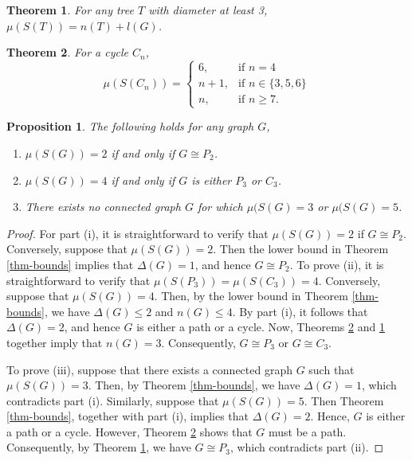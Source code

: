 \documentclass[10pt,a4paper]{amsart}
\newtheorem{theorem}{Theorem}
\newtheorem{proposition}{Proposition}
\begin{document}
\begin{theorem}\label{mv-tree}
    For any tree $T$ with diameter at least 3, $\mu(S(T)) = n(T)+l(G)$. 
\end{theorem}

\begin{theorem}\label{mv-cycle}
 For a cycle $C_n$, 
 $$ \mu(S(C_n))= \begin{cases}
        6, & \text{if } n=4\\
        n+1, & \text{if } n \in \{3,5,6\}\\
        n, & \text{if } n\geq 7.
    \end{cases}$$
\end{theorem}

\begin{proposition}
    The following holds for any graph $G$,
    \begin{enumerate}[label=\roman*.]
        \item  $\mu(S(G))=2$ if and only if $G \cong P_2$.
      \item  $\mu(S(G))= 4$ if and only if $G$ is either $P_3$ or $C_3$.
    \item There exists no connected graph $G$ for which $\mu(S(G)= 3$ or $\mu(S(G)=5$.
    \end{enumerate}
\end{proposition}

\begin{proof}
  
For part (i), it is straightforward to verify that $\mu(S(G)) = 2$ if $G \cong P_2$. Conversely, suppose that $\mu(S(G)) = 2$. Then the lower bound in Theorem \ref{thm-bounds} implies that $\Delta(G) = 1$, and hence $G \cong P_2$.
 To prove (ii), it is straightforward to verify that 
$\mu(S(P_3)) = \mu(S(C_3)) = 4$. 
Conversely, suppose that $\mu(S(G)) = 4$. 
Then, by the lower bound in Theorem \ref{thm-bounds}, we have 
$\Delta(G) \leq 2$ and $n(G) \leq 4$. 
By part (i), it follows that $\Delta(G) = 2$, and hence $G$ is either a path or a cycle. 
Now, Theorems \ref{mv-cycle} and \ref{mv-tree} together imply that $n(G) = 3$. 
Consequently, $G \cong P_3$ or $G \cong C_3$.

To prove (iii), suppose that there exists a connected graph $G$ such that $\mu(S(G)) = 3$. 
Then, by Theorem \ref{thm-bounds}, we have $\Delta(G) = 1$, which contradicts part (i). 
Similarly, suppose that $\mu(S(G)) = 5$. 
Then Theorem \ref{thm-bounds}, together with part (i), implies that $\Delta(G) = 2$. 
Hence, $G$ is either a path or a cycle. 
However, Theorem \ref{mv-cycle} shows that $G$ must be a path. 
Consequently, by Theorem \ref{mv-tree}, we have $G \cong P_3$, which contradicts part (ii).

\end{proof}
\end{document}
